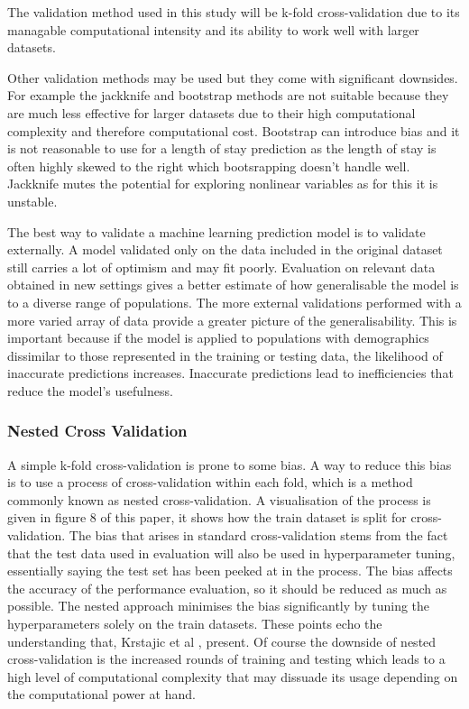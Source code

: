 \documentclass[11pt]{article}
\begin{document}
The validation method used in this study will be k-fold cross-validation due to its managable computational intensity and its ability to work well with larger datasets.

Other validation methods may be used but they come with significant downsides. For example the jackknife and bootstrap methods are not suitable because they are much less effective for larger datasets due to their high computational complexity and therefore computational cost. Bootstrap can introduce bias and it is not reasonable to use for a length of stay prediction as the length of stay is often highly skewed to the right which bootsrapping doesn't handle well. Jackknife mutes the potential for exploring nonlinear variables as for this it is unstable. 

The best way to validate a machine learning prediction model is to validate externally. A model validated only on the data included in the original dataset still carries a lot of optimism and may fit poorly. Evaluation on relevant data obtained in new settings gives a better estimate of how generalisable the model is to a diverse range of populations. The more external validations performed with a more varied array of data provide a greater picture of the generalisability. This is important because if the model is applied to populations with demographics dissimilar to those represented in the training or testing data, the likelihood of inaccurate predictions increases. Inaccurate predictions lead to inefficiencies that reduce the model's usefulness.

\subsubsection{Nested Cross Validation}
A simple k-fold cross-validation is prone to some bias. A way to reduce this bias is to use a process of cross-validation within each fold, which is a method commonly known as nested cross-validation. A visualisation of the process is given in figure 8 of this paper\cite{Bates2022}, it shows how the train dataset is split for cross-validation. The bias that arises in standard cross-validation stems from the fact that the test data used in evaluation will also be used in hyperparameter tuning, essentially saying the test set has been peeked at in the process. The bias affects the accuracy of the performance evaluation, so it should be reduced as much as possible. The nested approach minimises the bias significantly by tuning the hyperparameters solely on the train datasets. These points echo the understanding that, Krstajic et al \cite{Krstajic2014}, present. Of course the downside of nested cross-validation is the increased rounds of training and testing which leads to a high level of computational complexity that may dissuade its usage depending on the computational power at hand.
\end{document}
